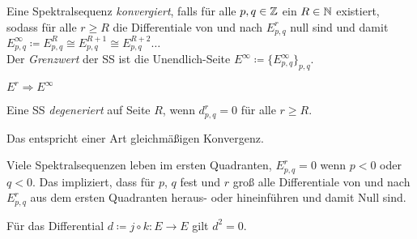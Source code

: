 \documentclass{cheat-sheet}
\newenvironment{centertikzcd}
  {\begin{center}\begin{tikzcd}}
  {\end{tikzcd}\end{center}}
\begin{document}
\begin{defn}
  Eine Spektralsequenz \emph{konvergiert}, falls für alle $p, q \in \mathbb{Z}$ ein $R \in \mathbb{N}$ existiert, sodass für alle $r \geq R$ die Differentiale von und nach $E^r_{p,q}$ null sind und damit $E^\infty_{p,q} \coloneqq E^R_{p,q} \cong E^{R+1}_{p,q} \cong E^{R+2}_{p,q} \ldots$ \\
  Der \emph{Grenzwert} der SS ist die Unendlich-Seite $E^\infty \coloneqq \{ E^\infty_{p,q} \}_{p,q}$.
\end{defn}

\begin{nota}
  $E^r \Rightarrow E^\infty$
\end{nota}

\begin{defn}
  Eine SS \emph{degeneriert} auf Seite $R$, wenn $d^r_{p,q} \!=\! 0$ für alle $r \!\geq\! R$.
\end{defn}

\begin{bem}
  Das entspricht einer Art gleichmäßigen Konvergenz.
\end{bem}

\begin{bem}
  Viele Spektralsequenzen leben im ersten Quadranten, \dh{} $E^r_{p,q} = 0$ wenn $p < 0$ oder $q < 0$. Das impliziert, dass für $p$, $q$ fest und $r$ groß alle Differentiale von und nach $E^r_{p,q}$ aus dem ersten Quadranten heraus- oder hineinführen und damit Null sind.
\end{bem}


\begin{bem}
  Für das Differential $d \coloneqq j \circ k : E \to E$ gilt $d^2 = 0$.
\end{bem}

\end{document}
